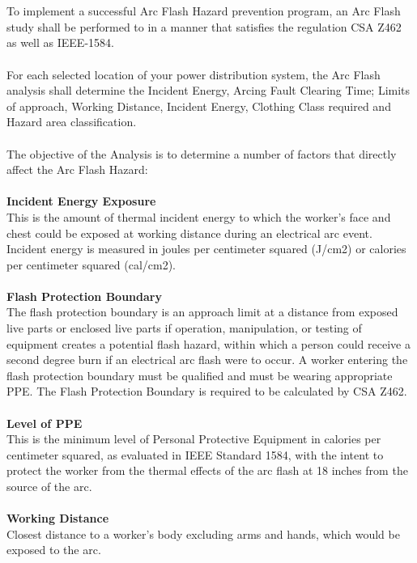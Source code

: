 \\
\\
To implement a successful Arc Flash Hazard prevention program, an Arc Flash study shall be performed to in a manner that satisfies the regulation CSA Z462 as well as IEEE-1584.
\\
\\
For each selected location of your power distribution system, the Arc Flash analysis shall determine the Incident Energy, Arcing Fault Clearing Time; Limits of approach, 
Working Distance, Incident Energy, Clothing Class required and Hazard area classification.
\\
\\
The objective of the Analysis is to determine a number of factors that directly affect the Arc Flash Hazard:
\\
\\
\textbf{Incident Energy Exposure }\\   
This is the amount of thermal incident energy to which the worker's face and chest could be exposed at working distance during an electrical arc event. Incident energy is measured in joules per centimeter squared (J/cm2) or calories per centimeter squared (cal/cm2). 
\\
\\  
\textbf{Flash Protection Boundary }\\   
The flash protection boundary is an approach limit at a distance from exposed live parts or enclosed live parts if operation, manipulation, or testing of equipment creates a potential flash hazard, within which a person could receive a second degree burn if an electrical arc flash were to occur. A worker entering the flash protection boundary must be qualified and must be wearing appropriate PPE. The Flash Protection Boundary is required to be calculated by CSA Z462. 
\\
\\ 
\textbf{Level of PPE} \\   
This is the minimum level of Personal Protective Equipment in calories per centimeter squared, as evaluated in IEEE Standard 1584, with the intent to protect the worker from the thermal effects of the arc flash at 18 inches from the source of the arc.
\\
\\		
\textbf{Working Distance}\\
Closest distance to a worker's body excluding arms and hands, which would be exposed to the arc.
\\
\\		
